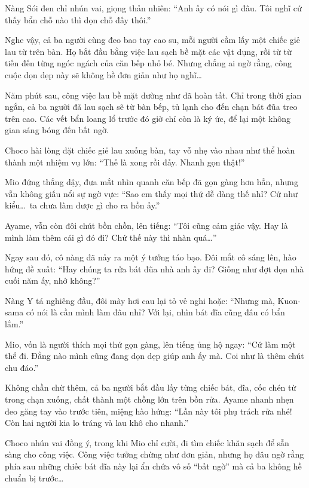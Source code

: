 \documentclass[../main.tex]{subfiles}
\begin{document}
Nàng Sói đen chỉ nhún vai, giọng thản nhiên: ``Anh ấy có nói gì đâu. Tôi nghĩ cứ thấy bẩn chỗ nào thì dọn chỗ đấy thôi.''

Nghe vậy, cả ba người cùng đeo bao tay cao su, mỗi người cầm lấy một chiếc giẻ lau từ trên bàn. Họ bắt đầu bằng việc lau sạch bề mặt các vật dụng, rồi từ từ tiến đến từng ngóc ngách của căn bếp nhỏ bé. Nhưng chẳng ai ngờ rằng, công cuộc dọn dẹp này sẽ không hề đơn giản như họ nghĩ\dots

\ct

Năm phút sau, công việc lau bề mặt dường như đã hoàn tất. Chỉ trong thời gian ngắn, cả ba người đã lau sạch sẽ từ bàn bếp, tủ lạnh cho đến chạn bát đũa treo trên cao. Các vết bẩn loang lổ trước đó giờ chỉ còn là ký ức, để lại một không gian sáng bóng đến bất ngờ.

Choco hài lòng đặt chiếc giẻ lau xuống bàn, tay vỗ nhẹ vào nhau như thể hoàn thành một nhiệm vụ lớn: ``Thế là xong rồi đấy. Nhanh gọn thật!''

Mio đứng thẳng dậy, đưa mắt nhìn quanh căn bếp đã gọn gàng hơn hẳn, nhưng vẫn không giấu nổi sự ngờ vực: ``Sao em thấy mọi thứ dễ dàng thế nhỉ? Cứ như kiểu\dots\ ta chưa làm được gì cho ra hồn ấy.''

Ayame, vẫn còn đôi chút bồn chồn, lên tiếng: ``Tôi cũng cảm giác vậy. Hay là mình làm thêm cái gì đó đi? Chứ thế này thì nhàn quá\dots''

Ngay sau đó, cô nàng đã nảy ra một ý tưởng táo bạo. Đôi mắt cô sáng lên, hào hứng đề xuất: ``Hay chúng ta rửa bát đũa nhà anh ấy đi? Giống như đợt dọn nhà cuối năm ấy, nhớ không?''

Nàng Y tá nghiêng đầu, đôi mày hơi cau lại tỏ vẻ nghi hoặc: ``Nhưng mà, Kuon-sama có nói là cần mình làm đâu nhỉ? Với lại, nhìn bát đĩa cũng đâu có bẩn lắm.''

Mio, vốn là người thích mọi thứ gọn gàng, lên tiếng ủng hộ ngay: ``Cứ làm một thể đi. Đằng nào mình cũng đang dọn dẹp giúp anh ấy mà. Coi như là thêm chút chu đáo.''

Không chần chừ thêm, cả ba người bắt đầu lấy từng chiếc bát, đĩa, cốc chén từ trong chạn xuống, chất thành một chồng lớn trên bồn rửa. Ayame nhanh nhẹn đeo găng tay vào trước tiên, miệng hào hứng: ``Lần này tôi phụ trách rửa nhé! Còn hai người kia lo tráng và lau khô cho nhanh.''

Choco nhún vai đồng ý, trong khi Mio chỉ cười, đi tìm chiếc khăn sạch để sẵn sàng cho công việc. Công việc tưởng chừng như đơn giản, nhưng họ đâu ngờ rằng phía sau những chiếc bát đĩa này lại ẩn chứa vô số ``bất ngờ'' mà cả ba không hề chuẩn bị trước\dots
\end{document}
